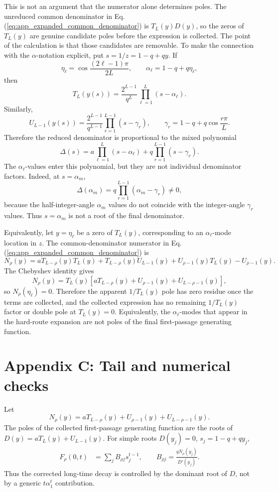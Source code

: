 \documentclass[superscriptaddress, amsmath, amssymb, aps, pre, floatfix]{revtex4-2}
\begin{document}
This is not an argument that the numerator alone determines poles.  The unreduced common denominator in Eq. (\ref{eq:app_expanded_common_denominator}) is \(T_L(y)D(y)\), so the zeros of \(T_L(y)\) are genuine candidate poles before the expression is collected.  The point of the calculation is that those candidates are removable.  To make the connection with the \(\alpha\)-notation explicit, put \(s=1/z=1-q+qy\).  If
\[
  \eta_\ell=\cos\frac{(2\ell-1)\pi}{2L},
  \qquad
  \alpha_\ell=1-q+q\eta_\ell,
\]
then
\[
  T_L(y(s))=\frac{2^{L-1}}{q^L}\prod_{\ell=1}^{L}(s-\alpha_\ell).
\]
Similarly,
\[
  U_{L-1}(y(s))=\frac{2^{L-1}}{q^{L-1}}\prod_{r=1}^{L-1}(s-\gamma_r),
  \qquad
  \gamma_r=1-q+q\cos\frac{r\pi}{L}.
\]
Therefore the reduced denominator is proportional to the mixed polynomial
\[
  \Delta(s)=
  a\prod_{\ell=1}^{L}(s-\alpha_\ell)
  +q\prod_{r=1}^{L-1}(s-\gamma_r).
\]
The \(\alpha_\ell\)-values enter this polynomial, but they are not individual denominator factors.  Indeed, at \(s=\alpha_m\),
\[
  \Delta(\alpha_m)=
  q\prod_{r=1}^{L-1}(\alpha_m-\gamma_r)\neq0,
\]
because the half-integer-angle \(\alpha_m\) values do not coincide with the integer-angle \(\gamma_r\) values.  Thus \(s=\alpha_m\) is not a root of the final denominator.

Equivalently, let \(y=\eta_\ell\) be a zero of \(T_L(y)\), corresponding to an \(\alpha_\ell\)-mode location in \(z\).  The common-denominator numerator in Eq. (\ref{eq:app_expanded_common_denominator}) is
\[
  N_\rho(y)
  =
  aT_{L-\rho}(y)T_L(y)+T_{L-\rho}(y)U_{L-1}(y)
  +U_{\rho-1}(y)T_L(y)-U_{\rho-1}(y).
\]
The Chebyshev identity gives
\[
  N_\rho(y)=T_L(y)\left[aT_{L-\rho}(y)+U_{\rho-1}(y)+U_{L-\rho-1}(y)\right],
\]
so \(N_\rho(\eta_\ell)=0\).  Therefore the apparent \(1/T_L(y)\) pole has zero residue once the terms are collected, and the collected expression has no remaining \(1/T_L(y)\) factor or double pole at \(T_L(y)=0\).  Equivalently, the \(\alpha_\ell\)-modes that appear in the hard-route expansion are not poles of the final first-passage generating function.

\section*{Appendix C: Tail and numerical checks}

Let
\[
  N_\rho(y)=aT_{L-\rho}(y)+U_{\rho-1}(y)+U_{L-\rho-1}(y).
\]
The poles of the collected first-passage generating function are the roots of \(D(y)=aT_L(y)+U_{L-1}(y)\).  For simple roots \(D(y_j)=0\), \(s_j=1-q+qy_j\),
\begin{align}
F_{\rho}(0,t)
&=\sum_j B_{\rho j}s_j^{t-1},\qquad
B_{\rho j}=\frac{qN_\rho(y_j)}{D'(y_j)}.
\label{eq:app_tail_residue}
\end{align}
Thus the corrected long-time decay is controlled by the dominant root of \(D\), not by a generic \(t\alpha_1^t\) contribution.
\end{document}
